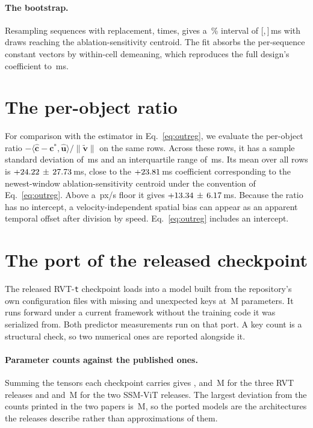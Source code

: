 \documentclass[10pt,twocolumn,letterpaper]{article}
\begin{document}
\paragraph{The bootstrap.} Resampling sequences with replacement,
\outBootDraws{} times, gives a \bootCI\,\% interval of
[\outBootLo,\,\outBootHi]\,ms with \outBootBeyond{} draws reaching the
ablation-sensitivity centroid. The fit absorbs the per-sequence constant vectors by within-cell
demeaning, which reproduces the full design’s coefficient to \fwlAgree\,ms.

\section{The per-object ratio}
\label{sup:ratio}

For comparison with the estimator in Eq.~\ref{eq:outreg}, we evaluate the per-object ratio
$-\langle\hat{\mathbf c}-\mathbf c^{*},\hat{\mathbf u}\rangle/\lVert \tilde{\mathbf v}\rVert$
on the same \outMatches{} rows. Across these rows, it has a sample standard deviation
of \ratioSD\,ms and an
interquartile range of \ratioIQR\,ms. Its mean over all rows is
$+24.22\,\pm\,27.73$\,ms, close to the $+23.81$\,ms coefficient
corresponding to the newest-window ablation-sensitivity centroid under the convention
of Eq.~\ref{eq:outreg}. Above a \ratioFloorSpeed\,px/s floor it gives
$+13.34\,\pm\,6.17$\,ms. Because the ratio has no intercept, a
velocity-independent spatial bias can appear as an apparent temporal offset after division
by speed. Eq.~\ref{eq:outreg} includes an intercept.

\section{The port of the released checkpoint}
\label{sup:port}

The released RVT-\texttt{t} checkpoint loads into a model built from the
repository's own configuration files with \rvtMissingKeys{} missing and
\rvtUnexpectedKeys{} unexpected keys at \rvtParams\,M parameters. It runs
forward under a current framework without the training code it was serialized
from. Both predictor measurements run on that port. A key count is a structural
check, so two numerical ones are reported alongside it.

\paragraph{Parameter counts against the published ones.} Summing the tensors each
checkpoint carries gives \rvtParams{}, \capParamsS{} and \capParamsB\,M for the three RVT
releases and \ssmParamsS{} and \ssmParamsB\,M for the two SSM-ViT releases. The largest
deviation from the counts printed in the two papers is \portParamDev\,M, so the ported
models are the architectures the releases describe rather than approximations of them.
\end{document}

